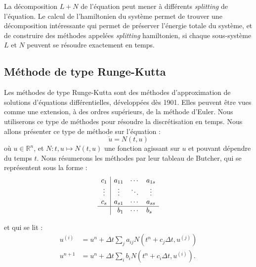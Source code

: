 La décomposition $L+N$ de l'équation peut mener à différents \emph{splitting} de l'équation. Le calcul de l'hamiltonien du système permet de trouver une décomposition intéressante qui permet de préserver l'énergie totale du système, et de construire des méthodes appelées \emph{splitting} hamiltonien, si chaque sous-système $L$ et $N$ peuvent se résoudre exactement en temps. 


\subsection{Méthode de type Runge-Kutta}

Les méthodes de type Runge-Kutta sont des méthodes d'approximation de solutions d'équations différentielles, développées dès 1901. Elles peuvent être vues comme une extension, à des ordres supérieurs, de la méthode d'Euler. Nous utiliserons ce type de méthodes pour résoudre la discrétisation en temps. Nous allons présenter ce type de méthode sur l'équation :
$$
  \dot{u} = N(t,u)
$$
où $u\in\mathbb{R}^n$, et $N:t,u\mapsto N(t,u)$ une fonction agissant sur $u$ et pouvant dépendre du temps $t$. Nous résumerons les méthodes par leur tableau de Butcher\cite{Butcher:2008}, qui se représentent sous la forme :
\begin{equation}  
  \begin{array}{c|c}
    \begin{matrix}
      c_1 \\
      \vdots \\
      c_s
    \end{matrix}
    &
    \begin{matrix}
      a_{11} & \cdots & a_{1s} \\
      \vdots & \ddots & \vdots \\
      a_{s1} & \cdots & a_{ss}
    \end{matrix} \\
    \hline
     & \begin{matrix} b_1 & \cdots & b_s \end{matrix} \\
  \end{array}
  \label{eq:0:butcher}
\end{equation}

et qui se lit :
$$
  \begin{aligned}
    u^{(i)} &= u^n + \Delta t \sum_j a_{ij} N(t^n+c_j\Delta t,u^{(j)}) \\
    u^{n+1} &= u^n + \Delta t \sum_i b_i N(t^n+c_i\Delta t, u^{(i)}).
  \end{aligned}
$$

